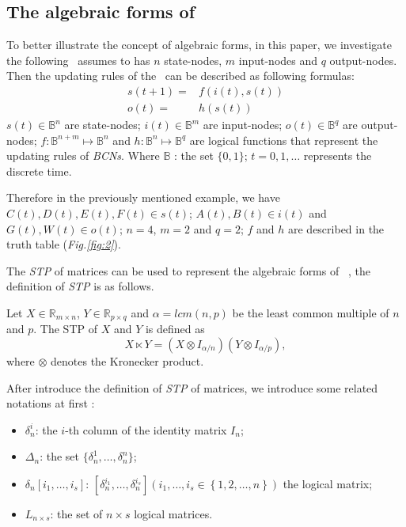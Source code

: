 \subsection{The algebraic forms of \BCNs}
To better illustrate the concept of algebraic forms, in this paper, we investigate the following \BCN\ assumes to has $n$ state-nodes, $m$ input-nodes and $q$ output-nodes. Then the updating rules of the \BCN\ can be described as following formulas:
\begin{equation}
\begin{split}
s(t+1)=&f(i(t),s(t))\\
o(t)=&h(s(t))
\end{split}
\label{equ:1}
\end{equation}
$s(t)\in \mathbb{B}^n$ are state-nodes; $i(t)\in \mathbb{B}^m$ are input-nodes; $o(t)\in \mathbb{B}^q$ are output-nodes; $f:\mathbb{B}^{n+m}\mapsto \mathbb{B}^n$ and $h:\mathbb{B}^n\mapsto \mathbb{B}^q$ are logical functions that represent the updating rules of {\em BCNs}. Where $\mathbb{B}$ : the set $\{0,1\}$; $t=0,1,\ldots$ represents the discrete time. 

Therefore in the previously mentioned example, we have $C(t), D(t), E(t), F(t)\in s(t)$; $A(t), B(t)\in i(t)$ and $G(t), W(t)\in o(t)$; $n=4$, $m=2$ and $q=2$; $f$ and $h$ are described in the truth table ({\em Fig.\ref{fig:2}}). 

The {\em STP} of matrices can be used to represent the algebraic forms of \BCNs\ \cite{cheng2009controllability}, the definition of {\em STP} is as follows.

\begin{definition}[STP] 
	\cite{Cheng2011Analysis} Let $X\in\mathbb{R}_{m\times n}$, $Y\in\mathbb{R}_{p\times q}$ and $\alpha=lcm(n,p)$ be the least common multiple of $n$ and $p$. The STP of $X$ and $Y$ is defined as \[X\ltimes Y=(X\otimes I_{\alpha/n})(Y\otimes I_{\alpha/p}),\] where $\otimes$ denotes the Kronecker product. 
\end{definition}

After introduce the definition of {\em STP} of matrices,  we introduce some related notations at first \cite{Zhang2016Observability}:
\begin{itemize}
  \item $\delta^i_n$: the $i$-th column of the identity matrix $I_n$;
  \item $\Delta_n$: the set $\{\delta^1_n,\ldots,\delta^n_n \}$; 
  \item $\delta_n \left[i_1,\ldots,i_s\right]$: $\left[\delta^{i_1}_n,\ldots,\delta^{i_s}_n\right]\left(i_1,\ldots,i_s\in\left\{1,2,\ldots,n\right\}\right)$ the logical matrix;
  \item  $L_{n\times s}$: the set of $n\times s$ logical matrices.
\end{itemize}


